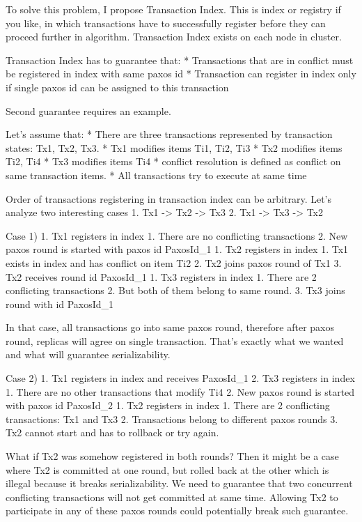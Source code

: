 To solve this problem, I propose Transaction Index. This is index or registry if you like, in which transactions have to successfully register before they can proceed further in algorithm.        Transaction Index exists on each node in cluster.


Transaction Index has to guarantee that:
* Transactions that are in conflict must be registered in index with same paxos id
* Transaction can register in index only if single paxos id can be assigned to this transaction


Second guarantee requires an example.


Let’s assume that:
* There are three transactions represented by transaction states: Tx1, Tx2, Tx3.
* Tx1 modifies items Ti1, Ti2, Ti3
* Tx2 modifies items Ti2, Ti4
* Tx3 modifies items Ti4
* conflict resolution is defined as conflict on same transaction items.
* All transactions try to execute at same time


Order of transactions registering in transaction index can be arbitrary. Let’s analyze two interesting cases
1. Tx1 -> Tx2 -> Tx3
2. Tx1 -> Tx3 -> Tx2


Case 1)
1. Tx1 registers in index
   1. There are no conflicting transactions
   2. New paxos round is started with paxos id PaxosId_1
1. Tx2 registers in index
   1. Tx1 exists in index and has conflict on item Ti2
   2. Tx2 joins paxos round of Tx1 
   3. Tx2 receives round id PaxosId_1
1. Tx3 registers in index
   1. There are 2 conflicting transactions
   2. But both of them belong to same round. 
   3. Tx3 joins round with id PaxosId_1


In that case, all transactions go into same paxos round, therefore after paxos round, replicas will agree on single transaction. That’s exactly what we wanted and what will guarantee serializability.


Case 2)
1. Tx1 registers in index and receives PaxosId_1
2. Tx3 registers in index
   1. There are no other transactions that modify Ti4
   2. New paxos round is started with paxos id PaxosId_2
1. Tx2 registers in index
   1. There are 2 conflicting transactions: Tx1 and Tx3
   2. Transactions belong to different paxos rounds
   3. Tx2 cannot start and has to rollback or try again.


What if Tx2 was somehow registered in both rounds? Then it might be a case where Tx2 is committed at one round, but rolled back at the other which is illegal because it breaks serializability. We need to guarantee that two concurrent conflicting transactions will not get committed at same time. Allowing Tx2 to participate in any of these paxos rounds could potentially break such guarantee.



